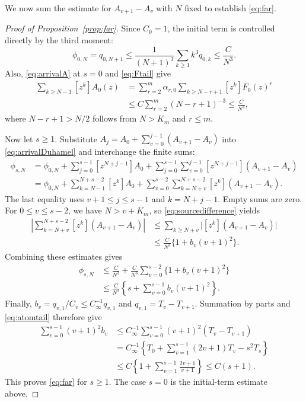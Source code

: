 \documentclass[11pt,letterpaper,reqno]{amsart}
\numberwithin{equation}{section}
\theoremstyle{plain}
\theoremstyle{remark}
\begin{document}
We now sum the estimate for $A_{v+1}-A_v$ with $N$ fixed to establish \eqref{eq:far}.
\begin{proof}[Proof of Proposition~\ref{prop:far}]
Since $C_0=1$, the initial term is controlled directly by the third moment:
\[
 \phi_{0,N}=q_{0,N+1}
 \le\frac1{(N+1)^3}\sum_{k\ge1}k^3q_{0,k}
 \le\frac C{N^3}.
\]
Also, \eqref{eq:arrivalA} at $s=0$ and \eqref{eq:Ftail} give
\[
\begin{aligned}
 \sum_{k\ge N-1}[z^k]A_0(z)
 &=\sum_{r=2}^m\alpha_{r,0}
       \sum_{k\ge N-r+1}[z^k]F_0(z)^r\\
 &\le C\sum_{r=2}^m(N-r+1)^{-3}
 \le\frac C{N^3},
\end{aligned}
\]
where $N-r+1>N/2$ follows from $N>K_m$ and $r\le m$.

Now let $s\ge1$. Substitute $A_j=A_0+\sum_{v=0}^{j-1}(A_{v+1}-A_v)$ into \eqref{eq:arrivalDuhamel} and interchange the finite sums:
\[
\begin{aligned}
 \phi_{s,N}
 &=\phi_{0,N}+\sum_{j=0}^{s-1}[z^{N+j-1}]A_0
 +\sum_{j=0}^{s-1}\sum_{v=0}^{j-1}
          [z^{N+j-1}](A_{v+1}-A_v)\\
 &=\phi_{0,N}+\sum_{k=N-1}^{N+s-2}[z^k]A_0
+\sum_{v=0}^{s-2}\sum_{k=N+v}^{N+s-2}
          [z^k](A_{v+1}-A_v).
\end{aligned}
\]
The last equality uses $v+1\le j\le s-1$ and $k=N+j-1$. Empty sums are zero. For $0\le v\le s-2$, we have $N>v+K_m$, so \eqref{eq:sourcedifference} yields
\[
\begin{aligned}
 \left|\sum_{k=N+v}^{N+s-2}[z^k](A_{v+1}-A_v)\right|
 &\le\sum_{k\ge N+v}\bigl|[z^k](A_{v+1}-A_v)\bigr|\\
 &\le\frac C{N^3}\{1+b_v(v+1)^2\}.
\end{aligned}
\]
Combining these estimates gives
\[
\begin{aligned}
 \phi_{s,N}
 &\le\frac C{N^3}
       +\frac C{N^3}\sum_{v=0}^{s-2}\{1+b_v(v+1)^2\}\\
 &\le\frac C{N^3}\left\{s+\sum_{v=0}^{s-1}b_v(v+1)^2\right\}.
\end{aligned}
\]
Finally, $b_v=q_{v,1}/C_v\le C_\infty^{-1}q_{v,1}$ and $q_{v,1}=T_v-T_{v+1}$. Summation by parts and \eqref{eq:atomtail} therefore give
\[
\begin{aligned}
 \sum_{v=0}^{s-1}(v+1)^2b_v
 &\le C_\infty^{-1}\sum_{v=0}^{s-1}(v+1)^2(T_v-T_{v+1})\\
 &=C_\infty^{-1}\left\{T_0+\sum_{v=1}^{s-1}(2v+1)T_v-s^2T_s\right\}\\
 &\le C\left\{1+\sum_{v=1}^{s-1}\frac{2v+1}{v+1}\right\}
 \le C(s+1).
\end{aligned}
\]
This proves \eqref{eq:far} for $s\ge1$. The case $s=0$ is the initial-term estimate above.
\end{proof}
\end{document}
